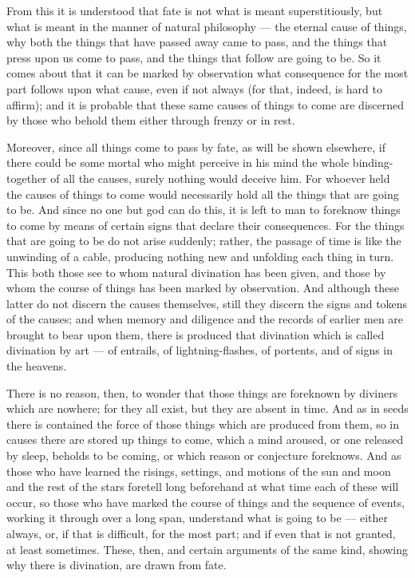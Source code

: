  From this it is understood that fate is not what is meant superstitiously, but what is meant in the manner of natural philosophy — the eternal cause of things, why both the things that have passed away came to pass, and the things that press upon us come to pass, and the things that follow are going to be. So it comes about that it can be marked by observation what consequence for the most part follows upon what cause, even if not always (for that, indeed, is hard to affirm); and it is probable that these same causes of things to come are discerned by those who behold them either through frenzy or in rest.

 Moreover, since all things come to pass by fate, as will be shown elsewhere, if there could be some mortal who might perceive in his mind the whole binding-together of all the causes, surely nothing would deceive him. For whoever held the causes of things to come would necessarily hold all the things that are going to be. And since no one but god can do this, it is left to man to foreknow things to come by means of certain signs that declare their consequences. For the things that are going to be do not arise suddenly; rather, the passage of time is like the unwinding of a cable, producing nothing new and unfolding each thing in turn. This both those see to whom natural divination has been given, and those by whom the course of things has been marked by observation. And although these latter do not discern the causes themselves, still they discern the signs and tokens of the causes; and when memory and diligence and the records of earlier men are brought to bear upon them, there is produced that divination which is called divination by art — of entrails, of lightning-flashes, of portents, and of signs in the heavens.

 There is no reason, then, to wonder that those things are foreknown by diviners which are nowhere; for they all exist, but they are absent in time. And as in seeds there is contained the force of those things which are produced from them, so in causes there are stored up things to come, which a mind aroused, or one released by sleep, beholds to be coming, or which reason or conjecture foreknows. And as those who have learned the risings, settings, and motions of the sun and moon and the rest of the stars foretell long beforehand at what time each of these will occur, so those who have marked the course of things and the sequence of events, working it through over a long span, understand what is going to be — either always, or, if that is difficult, for the most part; and if even that is not granted, at least sometimes. These, then, and certain arguments of the same kind, showing why there is divination, are drawn from fate.

